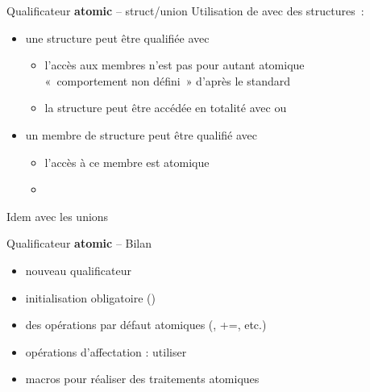 \begin {frame} {Qualificateur \textbf {atomic} -- struct/union}
    Utilisation de  avec des structures~:

    \begin {itemize}
	\item une structure peut être qualifiée avec 
	    \begin {itemize}
		\item l'accès aux membres n'est pas pour autant atomique
		    \\
		    \implique «~comportement non défini~» d'après le standard

		\item la structure peut être accédée en totalité
		    avec  ou 

	    \end {itemize}

	\item un membre de structure peut être qualifié avec 
	    \begin {itemize}
		\item l'accès à ce membre est atomique
		\item {}

	    \end {itemize}
    \end {itemize}

    Idem avec les unions
\end {frame}

\begin {frame} {Qualificateur \textbf {atomic} -- Bilan}
    \begin {itemize}
	\item nouveau qualificateur 
	\item initialisation obligatoire ()
	\item des opérations par défaut atomiques (\code {++}, \code
	    {+=}, etc.)
	\item opérations d'affectation : utiliser 
	\item macros pour réaliser des traitements atomiques

    \end {itemize}

\end {frame}

